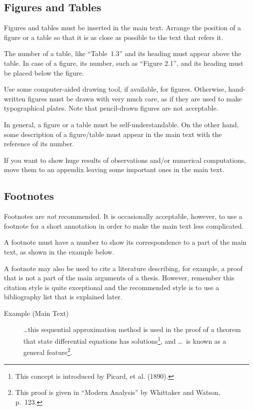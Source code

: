 \documentclass[english]{kuisthesis}
\begin{document}
\subsection{Figures and Tables}\label{subsec-figure}
Figures and tables must be inserted in the main text.  Arrange the position
of a figure or a table so that it is as close as possible to the text that
refers it.

The number of a table, like ``Table~1.3'' and its heading must appear above
the table.  In case of a figure, its number, such as ``Figure 2.1'', and its
heading must be placed below the figure.

Use some computer-aided drawing tool, if available, for figures.  Otherwise,
hand-written figures must be drawn with very much care, as if they are used
to make typographical plates.  Note that pencil-drawn figures are not
acceptable.

In general, a figure or a table must be self-understandable.  On the other
hand, some description of a figure/table must appear in the main text with
the reference of its number.

If you want to show huge results of observations and/or numerical
computations, move them to an appendix leaving some important ones in the
main text.

\subsection{Footnotes}\label{subsec-footnote}
Footnotes are {\em not} recommended.  It is occasionally acceptable,
however, to use a footnote for a short annotation in order to make the main
text less complicated.

A footnote must have a number to show its correspondence to a part of the
main text, as shown in the example below.

A footnote may also be used to cite a literature describing, for example, a
proof that is not a part of the main arguments of a thesis.  However,
remember this citation style is quite exceptional and the recommended style
is to use a bibliography list that is explained later.

\begin{description}
\item[Example {\rm(Main Text)}]\leavevmode\par
\ldots this sequential approximation method is used in the proof of a theorem
that state differential equations has solutions\footnote{This concept is
introduced by Picard, et al. (1890).}, and \ldots\ is known as a general
feature\footnote{This proof is given in ``Modern Analysis'' by Whittaker and
Watson, p.~123.}.
\end{description}
\end{document}
